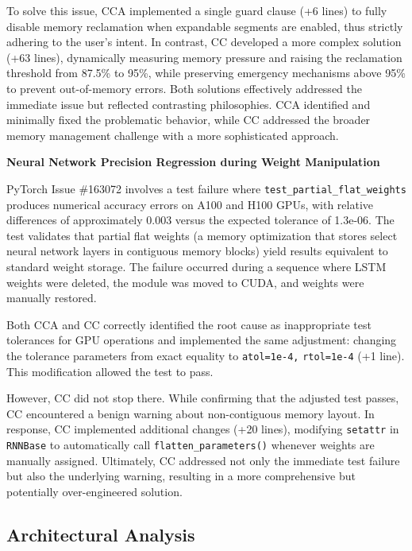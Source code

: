 To solve this issue, CCA implemented a single guard clause (+6 lines) to fully disable memory reclamation when expandable segments are enabled, thus strictly adhering to the user's intent. In contrast, CC developed a more complex solution (+63 lines), dynamically measuring memory pressure and raising the reclamation threshold from 87.5\% to 95\%, while preserving emergency mechanisms above 95\% to prevent out-of-memory errors. Both solutions effectively addressed the immediate issue but reflected contrasting philosophies. CCA identified and minimally fixed the problematic behavior, while CC addressed the broader memory management challenge with a more sophisticated approach. 

\textbf{Neural Network Precision Regression during Weight Manipulation}

PyTorch Issue \#163072 involves a test failure where \small{\texttt{test\_partial\_flat\_weights}} \normalsize produces numerical accuracy errors on A100 and H100 GPUs, with relative differences of approximately 0.003 versus the expected tolerance of 1.3e-06. The test validates that partial flat weights (a memory optimization that stores select neural network layers in contiguous memory blocks) yield results equivalent to standard weight storage. The failure occurred during a sequence where LSTM weights were deleted, the module was moved to CUDA, and weights were manually restored. 

Both CCA and CC correctly identified the root cause as inappropriate test tolerances for GPU operations and  implemented the same adjustment: changing the tolerance parameters from exact equality to \small{\texttt{atol=1e-4,} \texttt{rtol=1e-4}} \normalsize (+1 line). This modification allowed the test to pass. 

However, CC did not stop there. While confirming that the adjusted test passes, CC encountered a benign warning about non-contiguous memory layout. In response, CC implemented additional changes (+20 lines), modifying \small{\texttt{setattr}} \normalsize in \small{\texttt{RNNBase}} \normalsize to automatically call \small{\texttt{flatten\_parameters()}} \normalsize whenever weights are manually assigned. Ultimately, CC addressed not only the immediate test failure but also the underlying warning, resulting in a more comprehensive but potentially over-engineered solution. 

\subsection{Architectural Analysis}


